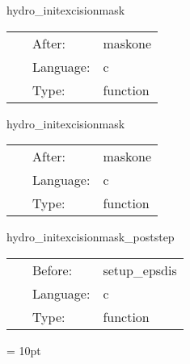 \documentclass{article}
\begin{document}

\hspace{5mm} hydro\_initexcisionmask 

\hspace{5mm}{\it sets up the excision mask } 


\hspace{5mm}

 \begin{tabular*}{160mm}{cll} 
~ & After:  & maskone \\ 
~ & Language:  & c \\ 
~ & Type:  & function \\ 
\end{tabular*} 


\vspace{5mm}


\hspace{5mm} hydro\_initexcisionmask 

\hspace{5mm}{\it sets up the excision mask } 


\hspace{5mm}

 \begin{tabular*}{160mm}{cll} 
~ & After:  & maskone \\ 
~ & Language:  & c \\ 
~ & Type:  & function \\ 
\end{tabular*} 


\vspace{5mm}


\hspace{5mm} hydro\_initexcisionmask\_poststep 

\hspace{5mm}{\it sets up the excision mask } 


\hspace{5mm}

 \begin{tabular*}{160mm}{cll} 
~ & Before:  & setup\_epsdis \\ 
~ & Language:  & c \\ 
~ & Type:  & function \\ 
\end{tabular*} 



\vspace{5mm}\parskip = 10pt 
\end{document}
